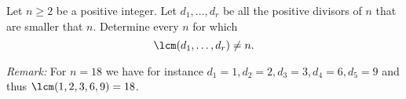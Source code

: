 Let $n\geq 2$ be a positive integer.
Let $d_1, \ldots, d_r$ be all the positive divisors of $n$ that are smaller that $n$.
Determine every $n$ for which
$$\lcm(d_1, \ldots, d_r) \neq n.$$

\textit{Remark:} For $n=18$ we have for instance $d_1 = 1, d_2 = 2, d_3 = 3, d_4 = 6, d_5=9$ and
thus $\lcm(1,2,3,6,9) = 18$.
